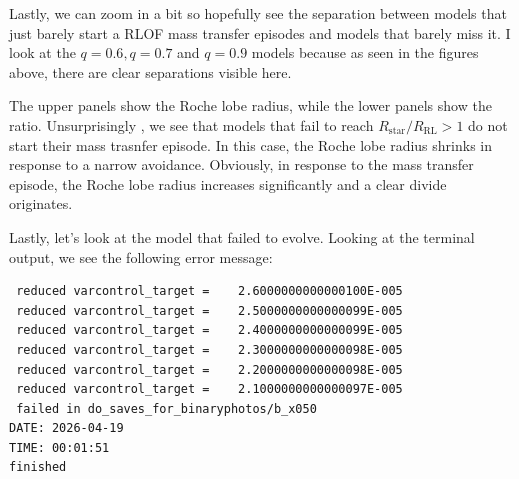 \documentclass[a4paper,10pt]{article}
\begin{document}
\nextpage

Lastly, we can zoom in a bit so hopefully see the separation between models that just barely start a RLOF mass transfer episodes and models that barely miss it. I look at the \(q=0.6, q=0.7\) and \(q=0.9\) models because as seen in the figures above, there are clear separations visible here.

The upper panels show the Roche lobe radius, while the lower panels show the ratio. Unsurprisingly
, we see that models that fail to reach \(R_\text{star}/ R_\text{RL} > 1\) do not start their mass trasnfer episode. In this case, the Roche lobe radius shrinks in response to a narrow avoidance. Obviously, in response to the mass transfer episode, the Roche lobe radius increases significantly and a clear divide originates.
\begin{figure}[ht]
    \centering
\end{figure}

\begin{figure}[ht]
    \centering
\end{figure}

Lastly, let's look at the model that failed to evolve. Looking at the terminal output, we see the following error message:
\begin{verbatim}
 reduced varcontrol_target =    2.6000000000000100E-005
 reduced varcontrol_target =    2.5000000000000099E-005
 reduced varcontrol_target =    2.4000000000000099E-005
 reduced varcontrol_target =    2.3000000000000098E-005
 reduced varcontrol_target =    2.2000000000000098E-005
 reduced varcontrol_target =    2.1000000000000097E-005
 failed in do_saves_for_binaryphotos/b_x050
DATE: 2026-04-19
TIME: 00:01:51
finished 
\end{verbatim}
\end{document}
